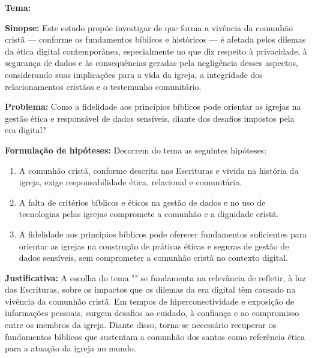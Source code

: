 \documentclass[12pt,a4paper]{article}
\begin{document}


\hypersetup{pageanchor=false}  %







\newpage
\pagestyle{plain}
\renewcommand{\baselinestretch}{1.5}
\normalsize
\noindent
\textbf{Tema:} \tema

\noindent
\textbf{Sinopse:} Este estudo propõe investigar de que forma a vivência da comunhão cristã — conforme os fundamentos bíblicos e históricos — é afetada pelos dilemas da ética digital contemporânea, especialmente no que diz respeito à privacidade, à segurança de dados e às consequências geradas pela negligência desses aspectos, considerando suas implicações para a vida da igreja, a integridade dos relacionamentos cristãos e o testemunho comunitário.

\noindent
\textbf{Problema:} Como a fidelidade aos princípios bíblicos pode orientar as igrejas na gestão ética e responsável de dados sensíveis, diante dos desafios impostos pela era digital?

\noindent
\textbf{Formulação de hipóteses:}
Decorrem do tema as seguintes hipóteses:
\begin{enumerate}
    \item A comunhão cristã, conforme descrita nas Escrituras e vivida na história da igreja, exige responsabilidade ética, relacional e comunitária.
    \item A falta de critérios bíblicos e éticos na gestão de dados e no uso de tecnologias pelas igrejas compromete a comunhão e a dignidade cristã.
    \item A fidelidade aos princípios bíblicos pode oferecer fundamentos suficientes para orientar as igrejas na construção de práticas éticas e seguras de gestão de dados sensíveis, sem comprometer a comunhão cristã no contexto digital.
\end{enumerate}

\noindent
\textbf{Justificativa:} A escolha do tema "\tema" se fundamenta na relevância de refletir, à luz das Escrituras, sobre os impactos que os dilemas da era digital têm causado na vivência da comunhão cristã. Em tempos de hiperconectividade e exposição de informações pessoais, surgem desafios ao cuidado, à confiança e ao compromisso entre os membros da igreja. Diante disso, torna-se necessário recuperar os fundamentos bíblicos que sustentam a comunhão dos santos como referência ética para a atuação da igreja no mundo.
\end{document}
